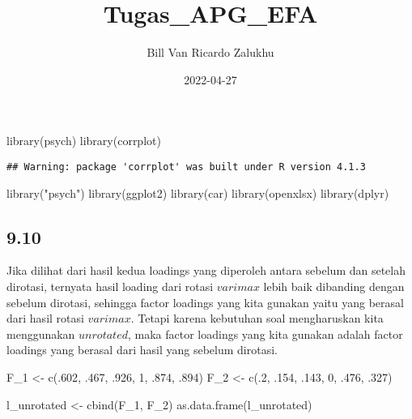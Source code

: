 \documentclass[
]{article}
\title{Tugas\_APG\_EFA}
\author{Bill Van Ricardo Zalukhu}
\date{2022-04-27}
\newenvironment{Shaded}{\begin{snugshade}}{\end{snugshade}}
\newcommand{\DecValTok}[1]{\textcolor[rgb]{0.00,0.00,0.81}{#1}}
\newcommand{\FunctionTok}[1]{\textcolor[rgb]{0.00,0.00,0.00}{#1}}
\newcommand{\NormalTok}[1]{#1}
\newcommand{\OtherTok}[1]{\textcolor[rgb]{0.56,0.35,0.01}{#1}}
\newcommand{\StringTok}[1]{\textcolor[rgb]{0.31,0.60,0.02}{#1}}
\begin{document}
\maketitle

\begin{Shaded}
\begin{Highlighting}[]
\FunctionTok{library}\NormalTok{(psych)}
\FunctionTok{library}\NormalTok{(corrplot)}
\end{Highlighting}
\end{Shaded}

\begin{verbatim}
## Warning: package 'corrplot' was built under R version 4.1.3
\end{verbatim}

\begin{Shaded}
\begin{Highlighting}[]
\FunctionTok{library}\NormalTok{(}\StringTok{"psych"}\NormalTok{)}
\FunctionTok{library}\NormalTok{(ggplot2)}
\FunctionTok{library}\NormalTok{(car)}
\FunctionTok{library}\NormalTok{(openxlsx)}
\FunctionTok{library}\NormalTok{(dplyr)}
\end{Highlighting}
\end{Shaded}

\hypertarget{section}{%
\subsection{9.10}\label{section}}

Jika dilihat dari hasil kedua loadings yang diperoleh antara sebelum dan
setelah dirotasi, ternyata hasil loading dari rotasi \(varimax\) lebih
baik dibanding dengan sebelum dirotasi, sehingga factor loadings yang
kita gunakan yaitu yang berasal dari hasil rotasi \(varimax\). Tetapi
karena kebutuhan soal mengharuskan kita menggunakan \(unrotated\), maka
factor loadings yang kita gunakan adalah factor loadings yang berasal
dari hasil yang sebelum dirotasi.

\begin{Shaded}
\begin{Highlighting}[]
\NormalTok{F\_1 }\OtherTok{\textless{}{-}} \FunctionTok{c}\NormalTok{(.}\DecValTok{602}\NormalTok{, .}\DecValTok{467}\NormalTok{, .}\DecValTok{926}\NormalTok{, }\DecValTok{1}\NormalTok{, .}\DecValTok{874}\NormalTok{, .}\DecValTok{894}\NormalTok{)}
\NormalTok{F\_2 }\OtherTok{\textless{}{-}} \FunctionTok{c}\NormalTok{(.}\DecValTok{2}\NormalTok{, .}\DecValTok{154}\NormalTok{, .}\DecValTok{143}\NormalTok{, }\DecValTok{0}\NormalTok{, .}\DecValTok{476}\NormalTok{, .}\DecValTok{327}\NormalTok{)}

\NormalTok{l\_unrotated }\OtherTok{\textless{}{-}} \FunctionTok{cbind}\NormalTok{(F\_1, F\_2)}
\FunctionTok{as.data.frame}\NormalTok{(l\_unrotated)}
\end{Highlighting}
\end{Shaded}
\end{document}
